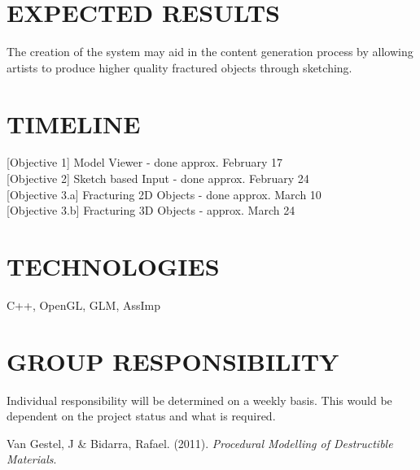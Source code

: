 \documentclass[titlepage, 11pt]{article}
\begin{document}
\section{EXPECTED RESULTS}
The creation of the system may aid in the content generation process by allowing artists to produce higher quality fractured objects through sketching.

\section{TIMELINE}
{[Objective 1]} Model Viewer - done approx. February 17\\
{[Objective 2]} Sketch based Input - done approx. February 24\\
{[Objective 3.a]} Fracturing 2D Objects - done approx. March 10\\
{[Objective 3.b]} Fracturing 3D Objects - approx. March 24

\section{TECHNOLOGIES}
C++, OpenGL, GLM, AssImp

\section{GROUP RESPONSIBILITY}
Individual responsibility will be determined on a weekly basis. This would be dependent on the project status and what is required. 

\begin{thebibliography}{1}

 Van Gestel, J \& Bidarra, Rafael. (2011). {\em Procedural Modelling of Destructible Materials}.

\end{thebibliography}
\end{document}
